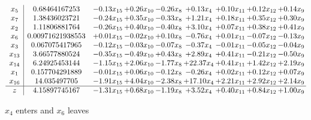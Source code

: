 \documentclass[9pt]{article}
\begin{document}
 \[\begin{array}{c| c c@{\hskip 2pt} c@{\hskip 2pt} c@{\hskip 2pt} c@{\hskip 2pt} c@{\hskip 2pt} c@{\hskip 2pt} c@{\hskip 2pt} }
 x_{5}   &  0.68464167253 & -0.13 x_{15} & +  0.26 x_{10} & -0.26 x_{8} & +  0.13 x_{4} & +  0.10 x_{11} & +  0.12 x_{12} & +  0.14 x_{9}\\
 x_{7}   &  1.38436023721 & -0.24 x_{15} & +  0.35 x_{10} & -0.33 x_{8} & +  1.21 x_{4} & +  0.18 x_{11} & +  0.35 x_{12} & +  0.30 x_{9}\\
 x_{2}   &  1.11806881764 & -0.26 x_{15} & +  0.40 x_{10} & -0.40 x_{8} & +  3.10 x_{4} & +  0.07 x_{11} & +  0.38 x_{12} & +  0.41 x_{9}\\
 x_{6}   &  0.00971621938553 & +  0.01 x_{15} & -0.02 x_{10} & +  0.10 x_{8} & -0.76 x_{4} & +  0.01 x_{11} & -0.07 x_{12} & -0.13 x_{9}\\
 x_{3}   &  0.067075417965 & -0.12 x_{15} & -0.03 x_{10} & -0.07 x_{8} & -0.37 x_{4} & -0.01 x_{11} & -0.05 x_{12} & -0.04 x_{9}\\
 x_{13}   &  3.66577880524 & -0.35 x_{15} & -0.49 x_{10} & +  0.43 x_{8} & +  2.89 x_{4} & +  0.41 x_{11} & -0.21 x_{12} & -0.50 x_{9}\\
 x_{14}   &  6.24925453144 & -1.15 x_{15} & +  2.06 x_{10} & -1.77 x_{8} & + 22.37 x_{4} & +  0.41 x_{11} & +  1.42 x_{12} & +  2.19 x_{9}\\
 x_{1}   &  0.157704291889 & -0.01 x_{15} & +  0.06 x_{10} & -0.12 x_{8} & -0.26 x_{4} & +  0.02 x_{11} & +  0.12 x_{12} & +  0.07 x_{9}\\
 x_{16}   &  14.035497705 & -1.91 x_{15} & +  4.04 x_{10} & -2.38 x_{8} & + 17.10 x_{4} & +  2.21 x_{11} & +  2.92 x_{12} & +  2.14 x_{9}\\
\hline
z    &  4.15897745167 & -1.31 x_{15} & +  0.68 x_{10} & -1.19 x_{8} & +  3.52 x_{4} & +  0.40 x_{11} & +  0.84 x_{12} & +  1.00 x_{9}\\
\end{array}\]


 $ x_{4} $ enters and $ x_{6} $ leaves 
\end{document}
